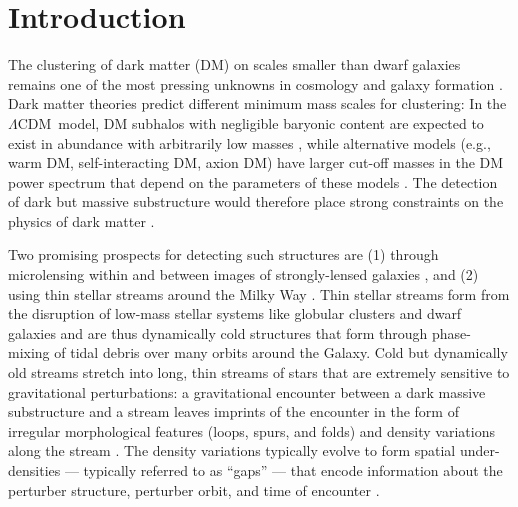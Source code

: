 \documentclass[12pt, modern]{aastex62}
\newcommand{\acronym}[1]{{\small{#1}}}
\newcommand{\lcdm}{\acronym{$\Lambda$CDM}}
\begin{document}

\section{Introduction}
\label{sec:intro}

The clustering of dark matter (DM) on scales smaller than dwarf galaxies remains one of the most pressing unknowns in cosmology and galaxy formation \citep[for a recent review, see][]{Bullock:2017}. %
Dark matter theories predict different minimum mass scales for clustering: In the \lcdm\ model, DM subhalos with negligible baryonic content are expected to exist in abundance with arbitrarily low masses \citep{Green:2004, Springel:2008}, while alternative models (e.g., warm DM, self-interacting DM, axion DM) have larger cut-off masses in the DM power spectrum that depend on the parameters of these models \citep{Bode:2001, Spergel:2000, Peebles:2000, Mocz:2017}.
The detection of dark but massive substructure would therefore place strong constraints on the physics of dark matter \citep[e.g.,][]{Buckley:2017}.

Two promising prospects for detecting such structures are (1) through microlensing within and between images of strongly-lensed galaxies \citep{Vegetti:2012}, and (2) using thin stellar streams around the Milky Way \citep{Johnston:2002, Ibata:2002}.
Thin stellar streams form from the disruption of low-mass stellar systems like globular clusters and dwarf galaxies \citep{TODO} and are thus dynamically cold structures that form through phase-mixing of tidal debris over many orbits around the Galaxy.
Cold but dynamically old streams stretch into long, thin streams of stars that are extremely sensitive to gravitational perturbations: a gravitational encounter between a dark massive substructure and a stream leaves imprints of the encounter in the form of irregular morphological features (loops, spurs, and folds) and density variations along the stream \citep{SiegalGaskins:2008, Carlberg:2009, Yoon:2011, Ngan:2016}.
The density variations typically evolve to form spatial under-densities --- typically referred to as ``gaps'' --- that encode information about the perturber structure, perturber orbit, and time of encounter \citep{Yoon:2011, Carlberg:2012, Carlberg:2013, Erkal:2015, Erkal:2015b}.
\end{document}
